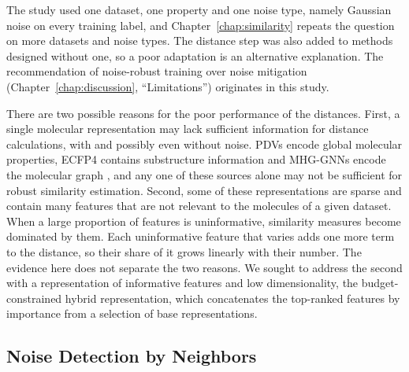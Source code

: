 The study used one dataset, one property and one noise type, namely Gaussian noise on every training label, and Chapter~\ref{chap:similarity} repeats the question on more datasets and noise types. The distance step was also added to methods designed without one, so a poor adaptation is an alternative explanation. The recommendation of noise-robust training over noise mitigation (Chapter~\ref{chap:discussion}, ``Limitations'') originates in this study.

There are two possible reasons for the poor performance of the distances. First, a single molecular representation may lack sufficient information for distance calculations, with and possibly even without noise. PDVs encode global molecular properties, ECFP4 contains substructure information and MHG-GNNs encode the molecular graph \citep{kishimoto2023}, and any one of these sources alone may not be sufficient for robust similarity estimation. Second, some of these representations are sparse and contain many features that are not relevant to the molecules of a given dataset. When a large proportion of features is uninformative, similarity measures become dominated by them. Each uninformative feature that varies adds one more term to the distance, so their share of it grows linearly with their number. The evidence here does not separate the two reasons. We sought to address the second with a representation of informative features and low dimensionality, the budget-constrained hybrid representation, which concatenates the top-ranked features by importance from a selection of base representations.


\subsection{Noise Detection by Neighbors}\label{sec:flaws:neighbors} %

